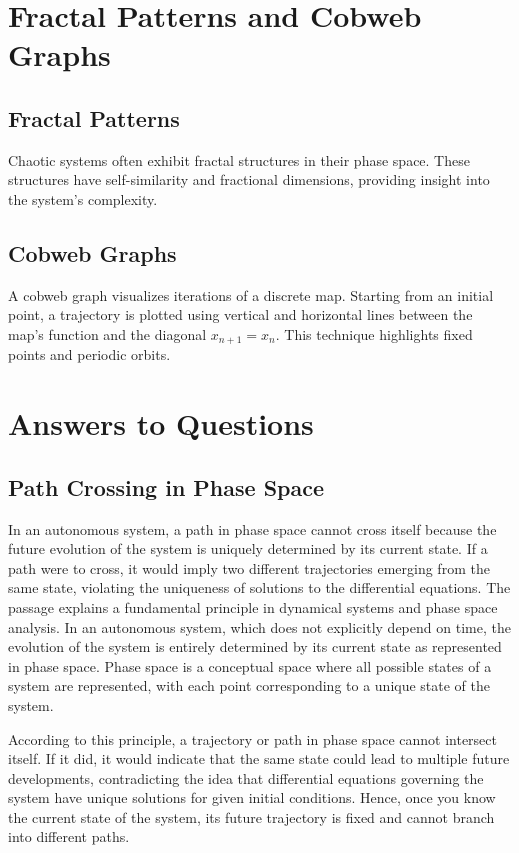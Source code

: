 \documentclass{article}
\begin{document}
\section{Fractal Patterns and Cobweb Graphs}

\subsection{Fractal Patterns}
Chaotic systems often exhibit fractal structures in their phase space. These structures have self-similarity and fractional dimensions, providing insight into the system's complexity.

\subsection{Cobweb Graphs}
A cobweb graph visualizes iterations of a discrete map. Starting from an initial point, a trajectory is plotted using vertical and horizontal lines between the map's function and the diagonal $x_{n+1} = x_n$. This technique highlights fixed points and periodic orbits.

\section{Answers to Questions}

\subsection{Path Crossing in Phase Space}
In an autonomous system, a path in phase space cannot cross itself because the future evolution of the system is uniquely determined by its current state. If a path were to cross, it would imply two different trajectories emerging from the same state, violating the uniqueness of solutions to the differential equations.
The passage explains a fundamental principle in dynamical systems and phase space analysis. In an autonomous system, which does not explicitly depend on time, the evolution of the system is entirely determined by its current state as represented in phase space. Phase space is a conceptual space where all possible states of a system are represented, with each point corresponding to a unique state of the system.

According to this principle, a trajectory or path in phase space cannot intersect itself. If it did, it would indicate that the same state could lead to multiple future developments, contradicting the idea that differential equations governing the system have unique solutions for given initial conditions. Hence, once you know the current state of the system, its future trajectory is fixed and cannot branch into different paths.
\end{document}
